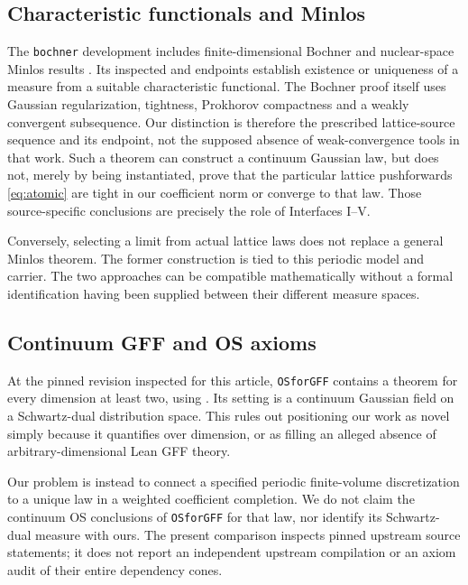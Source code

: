 \documentclass[11pt]{amsart}
\theoremstyle{remark}\newtheorem{remark}[theorem]{Remark}
\begin{document}
\subsection{Characteristic functionals and Minlos}
The \texttt{bochner} development includes finite-dimensional Bochner and nuclear-space Minlos results \cite{Bochner}. Its inspected  and  endpoints establish existence or uniqueness of a measure from a suitable characteristic functional. The Bochner proof itself uses Gaussian regularization, tightness, Prokhorov compactness and a weakly convergent subsequence. Our distinction is therefore the prescribed lattice-source sequence and its endpoint, not the supposed absence of weak-convergence tools in that work. Such a theorem can construct a continuum Gaussian law, but does not, merely by being instantiated, prove that the particular lattice pushforwards \eqref{eq:atomic} are tight in our coefficient norm or converge to that law. Those source-specific conclusions are precisely the role of Interfaces I--V.

Conversely, selecting a limit from actual lattice laws does not replace a general Minlos theorem. The former construction is tied to this periodic model and carrier. The two approaches can be compatible mathematically without a formal identification having been supplied between their different measure spaces.

\subsection{Continuum GFF and OS axioms}
At the pinned revision inspected for this article, \texttt{OSforGFF} contains a theorem  for every dimension at least two, using  \cite{OSforGFF}. Its setting is a continuum Gaussian field on a Schwartz-dual distribution space. This rules out positioning our work as novel simply because it quantifies over dimension, or as filling an alleged absence of arbitrary-dimensional Lean GFF theory.

Our problem is instead to connect a specified periodic finite-volume discretization to a unique law in a weighted coefficient completion. We do not claim the continuum OS conclusions of \texttt{OSforGFF} for that law, nor identify its Schwartz-dual measure with ours. The present comparison inspects pinned upstream source statements; it does not report an independent upstream compilation or an axiom audit of their entire dependency cones.
\end{document}
